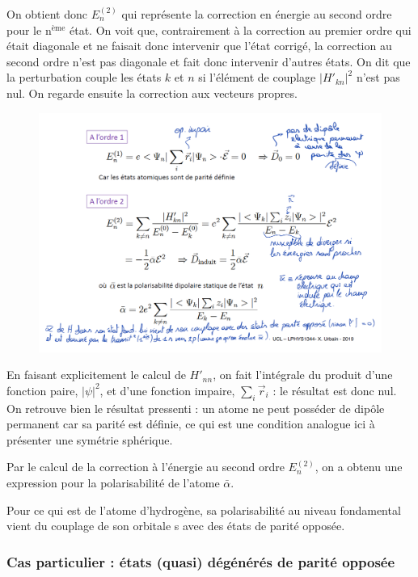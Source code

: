 On obtient donc $E_n^{(2)}$ qui représente la correction en énergie au second ordre pour le n$^\text{ème}$ état. On voit que, contrairement à la correction au premier ordre qui était diagonale et ne faisait donc intervenir que l'état corrigé, la correction au second ordre n'est pas diagonale et fait donc intervenir d'autres états. On dit que la perturbation couple les états $k$ et $n$ si l'élément de couplage $|H'_{kn}|^2$ n'est pas nul. On regarde ensuite la correction aux vecteurs propres.\\

\begin{figure}[htp]
    \centering
    \includegraphics[scale=0.65]{Images2/ordre2.2.PNG}
\end{figure}

En faisant explicitement le calcul de $H'_{nn}$, on fait l'intégrale du produit d'une fonction paire, $|\psi|^2$, et d'une fonction impaire, $\sum_i \vec{r}_i$ : le résultat est donc nul. On retrouve bien le résultat pressenti : un atome ne peut posséder de dipôle permanent car sa parité est définie, ce qui est une condition analogue ici à présenter une symétrie sphérique.

Par le calcul de la correction à l'énergie au second ordre $E_n^{(2)}$, on a obtenu une expression pour la polarisabilité de l'atome $\bar{\alpha}$.

Pour ce qui est de l'atome d'hydrogène, sa polarisabilité au niveau fondamental vient du couplage de son orbitale s avec des états de parité opposée.



\subsubsection{Cas particulier : états (quasi) dégénérés de parité opposée}


